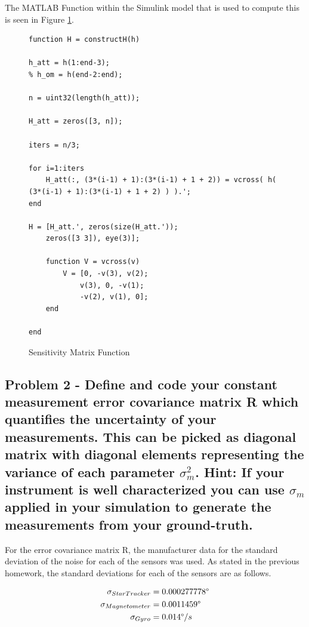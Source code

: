 The MATLAB Function within the Simulink model that is used to compute this is seen in Figure \ref{fig:sens_matrix_function}.

\begin{figure} [H]
    \centering
    \captionsetup{ justification = centering }
    \begin{lstlisting}
function H = constructH(h)

h_att = h(1:end-3);
% h_om = h(end-2:end);

n = uint32(length(h_att));

H_att = zeros([3, n]);

iters = n/3;

for i=1:iters
    H_att(:, (3*(i-1) + 1):(3*(i-1) + 1 + 2)) = vcross( h( (3*(i-1) + 1):(3*(i-1) + 1 + 2) ) ).';
end

H = [H_att.', zeros(size(H_att.'));
    zeros([3 3]), eye(3)];

    function V = vcross(v)
        V = [0, -v(3), v(2);
            v(3), 0, -v(1);
            -v(2), v(1), 0];
    end

end
    \end{lstlisting}
    \caption{Sensitivity Matrix Function}
    \label{fig:sens_matrix_function}
\end{figure}

\subsection{Problem 2 - Define and code your constant measurement error covariance matrix R which quantifies the uncertainty of your measurements. This can be picked as diagonal matrix with diagonal elements representing the variance of each parameter $\sigma^2_m$. Hint: If your instrument is well characterized you can use $\sigma_m$ applied in your simulation to generate the measurements from your ground-truth.}

For the error covariance matrix R, the manufacturer data for the standard deviation of the noise for each of the sensors was used. As stated in the previous homework, the standard deviations for each of the sensors are as follows.

\begin{align*}
    \sigma_{StarTracker} &= 0.000277778 \degree\\
    \sigma_{Magnetometer} &= 0.0011459 \degree\\
    \sigma_{Gyro} &= 0.014 \degree / s\\
\end{align*}

